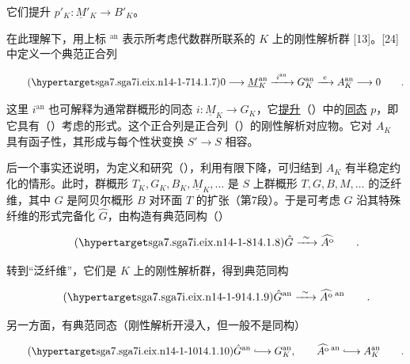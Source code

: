 \noindent
它们提升 $p'_K:\underline M'_K\longrightarrow B'_K$。

在此理解下，用上标 ${}^{\mathrm{an}}$ 表示所考虑代数群所联系的 $K$ 上的刚性解析群 [13]。[24] 中定义一个典范正合列

\begin{equation}\tag{\SGARefTarget{sga7.sga7i.eix.n14-1-7}{14.1.7}}
 0\longrightarrow\underline M_K^{\mathrm{an}}
 \xrightarrow{\ i^{\mathrm{an}}\ }G_K^{\mathrm{an}}
 \xrightarrow{\ e\ }A_K^{\mathrm{an}}\longrightarrow0\qquad .
\end{equation}

\noindent
这里 $i^{\mathrm{an}}$ 也可解释为通常群概形的同态 $i:\underline M_K\longrightarrow G_K$，它\underline{提升}（）中的\underline{同态} $p$，即它具有（）考虑的形式。这个正合列是正合列（）的刚性解析对应物。它对 $A_K$ 具有函子性，其形成与每个性状变换 $S'\longrightarrow S$ 相容。

后一个事实还说明，为定义和研究（），利用有限下降，可归结到 $A_K$ 有半稳定约化的情形。此时，群概形 $T_K,G_K,B_K,\underline M_K,\ldots$ 是 $S$ 上群概形 $T,G,B,M,\ldots$ 的泛纤维，其中 $G$ 是阿贝尔概形 $B$ 对环面 $T$ 的扩张（第7段）。于是可考虑 $G$ 沿其特殊纤维的形式完备化 $\hat G$，由构造有典范同构（）

\begin{equation}\tag{\SGARefTarget{sga7.sga7i.eix.n14-1-8}{14.1.8}}
 \hat G\xrightarrow{\ \sim\ }\widehat{A^{\mathrm o}}
 \qquad .
\end{equation}

\noindent
转到“泛纤维”，它们是 $K$ 上的刚性解析群，得到典范同构

\begin{equation}\tag{\SGARefTarget{sga7.sga7i.eix.n14-1-9}{14.1.9}}
 \hat G^{\mathrm{an}}\xrightarrow{\ \sim\ }
 \widehat{A^{\mathrm o}}\,{}^{\mathrm{an}}
 \qquad .
\end{equation}

\noindent
另一方面，有典范同态（刚性解析开浸入，但一般不是同构）

\begin{equation}\tag{\SGARefTarget{sga7.sga7i.eix.n14-1-10}{14.1.10}}
 \hat G^{\mathrm{an}}\lhook\joinrel\longrightarrow G_K^{\mathrm{an}},
 \qquad
 \widehat{A^{\mathrm o}}\,{}^{\mathrm{an}}
 \lhook\joinrel\longrightarrow A_K^{\mathrm{an}}
 \qquad .
\end{equation}

